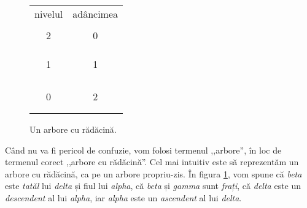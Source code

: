 \documentclass[9pt,a4paper]{article}
\begin{document}
\begin{figure}[htbp]
    \centering
    \begin{minipage}[t!]{0.3\textwidth}
        \begin{tabular}{cc}
            nivelul & adâncimea \\
                    &           \\
            2       & 0         \\
                    &           \\
                    &           \\
                    &           \\
            1       & 1         \\
                    &           \\
                    &           \\
                    &           \\
                    &           \\
            0       & 2         \\
                    &           \\
                    &           \\
        \end{tabular}
    \end{minipage}
    \begin{minipage}[t!]{0.65\textwidth}
    \end{minipage}
    \caption{Un arbore cu rădăcină.}
    \label{fig:arbore}
\end{figure}

Când nu va fi pericol de confuzie, vom folosi termenul ,,arbore'', în loc de termenul corect ,,arbore cu rădăcină''. Cel mai intuitiv este să reprezentăm un arbore cu rădăcină, ca pe un arbore propriu-zis. În figura \ref{fig:arbore}, vom spune că \textit{beta} este \textit{tatăl} lui \textit{delta} și fiul lui
\textit{alpha}, că \textit{beta} și \textit{gamma} sunt \textit{frați}, că \textit{delta} este un \textit{descendent} al lui \textit{alpha}, iar \textit{alpha} este un \textit{ascendent} al lui \textit{delta}.
\end{document}
